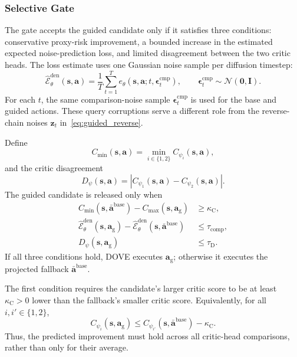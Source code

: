 \documentclass[9pt,journal]{IEEEtran}
\newcommand{\DOVE}{DOVE}
\newcommand{\EdenMC}{\ensuremath{\widehat{\mathcal{E}}_{\theta}^{\mathrm{den}}}}
\newcommand{\va}{\bm{a}}
\newcommand{\vs}{\bm{s}}
\newcommand{\veps}{\bm{\epsilon}}
\newcommand{\vag}{\ensuremath{\va_{\mathrm g}}}      %
\begin{document}
\subsubsection{Selective Gate}
\label{sec:selective_gate}

The gate accepts the guided candidate only if it
satisfies three conditions: conservative proxy-risk
improvement, a bounded increase in the estimated expected
noise-prediction loss, and limited disagreement between
the two critic heads. The loss estimate uses one Gaussian
noise sample per diffusion timestep:
\begin{equation}
    \EdenMC(\vs,\va)
    =
    \frac{1}{T}
    \sum_{t=1}^{T}
    e_\theta\!\left(
    \vs,\va;t,\veps_t^{\mathrm{cmp}}
    \right),
    \qquad
    \veps_t^{\mathrm{cmp}}
    \sim\mathcal N(\bm0,\bm I).
    \label{eq:compat_estimate}
\end{equation}
For each $t$, the same comparison-noise sample
$\veps_t^{\mathrm{cmp}}$ is used for the base and guided actions. These
query corruptions serve a different role from the reverse-chain noises
$\bm z_t$ in~\eqref{eq:guided_reverse}.

Define
\begin{equation*}
    C_{\min}(\vs,\va)
    =
    \min_{i\in\{1,2\}}C_{\psi_i}(\vs,\va),
\end{equation*}
and the critic disagreement
\begin{equation*}
    D_\psi(\vs,\va)
    =
    \left|
    C_{\psi_1}(\vs,\va)
    -
    C_{\psi_2}(\vs,\va)
    \right|.
\end{equation*}
The guided candidate is released only when
\begin{equation}
    \begin{aligned}
        C_{\min}
        \left(
        \vs,\bar{\va}^{\mathrm{base}}
        \right)
        -
        C_{\max}(\vs,\vag)
        &\geq
        \kappa_{\mathrm C},
        \\
        \EdenMC(\vs,\vag)
        -
        \EdenMC
        \left(
        \vs,\bar{\va}^{\mathrm{base}}
        \right)
        &\leq
        \tau_{\mathrm{comp}},
        \\
        D_\psi(\vs,\vag)
        &\leq
        \tau_{\mathrm D}.
    \end{aligned}
    \label{eq:execution_gate}
\end{equation}
If all three conditions hold, \DOVE{} executes $\vag$; otherwise it
executes the projected fallback $\bar{\va}^{\mathrm{base}}$.

The first condition requires the candidate's larger
critic score to be at least $\kappa_{\mathrm C}>0$
lower than the fallback's smaller critic score.
Equivalently, for all $i,i'\in\{1,2\}$,
\begin{equation*}
    C_{\psi_i}(\vs,\vag)
    \leq
    C_{\psi_{i'}}
    \left(
    \vs,\bar{\va}^{\mathrm{base}}
    \right)
    -
    \kappa_{\mathrm C}.
\end{equation*}
Thus, the predicted improvement must hold across
all critic-head comparisons, rather than only for
their average.
\end{document}
